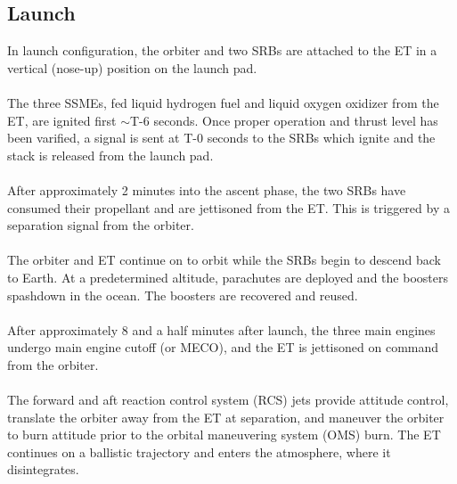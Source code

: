 \documentclass[13pt, letter,final]{article}
\begin{document}
\begin{multicols}{2}
\begin{center}
\subsection*{Launch}
\end{center}
In launch configuration, the orbiter and two SRBs are attached to the ET in a vertical (nose-up) position on the launch pad.\\
\\
The three SSMEs, fed liquid hydrogen fuel and liquid oxygen oxidizer from the ET, are ignited first $\sim$T-6 seconds. Once proper operation and thrust level has been varified, a signal is sent at T-0 seconds to the SRBs which ignite and the stack is released from the launch pad.\\
\\
After approximately 2 minutes into the ascent phase, the two SRBs have consumed their propellant and are jettisoned from the ET. This is triggered by a separation signal from the orbiter.\\
\\
The orbiter and ET continue on to orbit while the SRBs begin to descend back to Earth. At a predetermined altitude, parachutes are deployed and the boosters spashdown in the ocean.
The boosters are recovered and reused.\\
\\
After approximately 8 and a half minutes after launch, the three main engines undergo main engine cutoff (or MECO), and the ET is jettisoned on command from the orbiter.\\
\\
The forward and aft reaction control system (RCS) jets provide attitude control, translate the orbiter away from the ET at separation, and maneuver the orbiter to burn attitude prior to the orbital maneuvering system (OMS) burn. The ET continues on a ballistic trajectory and enters the atmosphere, where it disintegrates.\\
\\
\begin{center}

\end{center}
\end{multicols}
\end{document}
